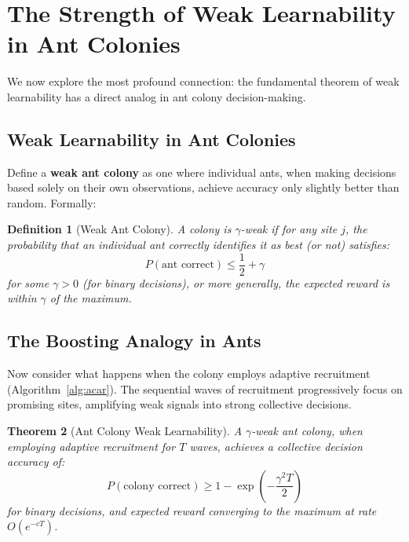 \documentclass[12pt,letterpaper]{article}
\newtheorem{theorem}{Theorem}[section]
\newtheorem{definition}[theorem]{Definition}
\begin{document}
\section{The Strength of Weak Learnability in Ant Colonies}

We now explore the most profound connection: the fundamental theorem of weak learnability has a direct analog in ant colony decision-making.

\subsection{Weak Learnability in Ant Colonies}

Define a \textbf{weak ant colony} as one where individual ants, when making decisions based solely on their own observations, achieve accuracy only slightly better than random. Formally:

\begin{definition}[Weak Ant Colony]
A colony is $\gamma$-weak if for any site $j$, the probability that an individual ant correctly identifies it as best (or not) satisfies:
\begin{equation}
P(\text{ant correct}) \leq \frac{1}{2} + \gamma
\end{equation}
for some $\gamma > 0$ (for binary decisions), or more generally, the expected reward is within $\gamma$ of the maximum.
\end{definition}

\subsection{The Boosting Analogy in Ants}

Now consider what happens when the colony employs adaptive recruitment (Algorithm~\ref{alg:acar}). The sequential waves of recruitment progressively focus on promising sites, amplifying weak signals into strong collective decisions.

\begin{theorem}[Ant Colony Weak Learnability]
A $\gamma$-weak ant colony, when employing adaptive recruitment for $T$ waves, achieves a collective decision accuracy of:
\begin{equation}
P(\text{colony correct}) \geq 1 - \exp\left(-\frac{\gamma^2 T}{2}\right)
\end{equation}
for binary decisions, and expected reward converging to the maximum at rate $O(e^{-cT})$.
\end{theorem}
\end{document}
